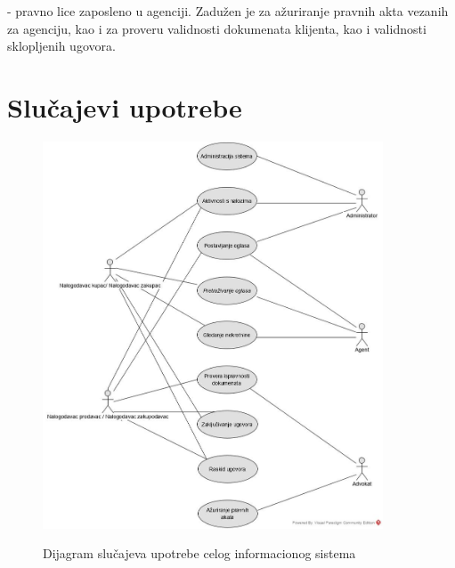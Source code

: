 \documentclass{article}
\begin{document}
 - pravno lice zaposleno u agenciji. Zadu\v {z}en je za a\v {z}uriranje pravnih akta vezanih za agenciju, kao i za proveru validnosti dokumenata klijenta, kao i validnosti sklopljenih ugovora.\\ 

\newpage
\section{\bfseries Slu\v{c}ajevi upotrebe}
\begin{figure}[h]
		\centering
		\includegraphics[width=0.9\textwidth,height=0.74\textheight]{Pictures/DijagramSlucajevaUpotrebeCelogInformacionogSistema}\\
		\caption{Dijagram slu\v{c}ajeva upotrebe celog informacionog sistema}
		\label{fig:dijagramSlucajevaUpotrebeCelogIS}
	\end{figure}

\newpage
\end{document}
